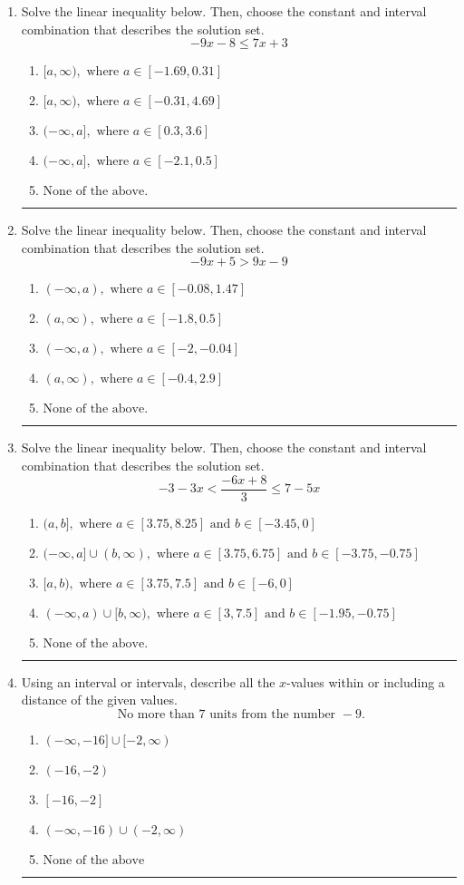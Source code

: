 \documentclass[14pt]{extbook}
\newcommand{\litem}[1]{\item#1\hspace*{-1cm}\rule{\textwidth}{0.4pt}}
\begin{document}
\begin{enumerate}
{\begin{enumerate}[label=\Alph*.]
\end{enumerate} }
\litem{
Solve the linear inequality below. Then, choose the constant and interval combination that describes the solution set.\[ -9x -8 \leq 7x + 3 \]\begin{enumerate}[label=\Alph*.]
\item \( [a, \infty), \text{ where } a \in [-1.69, 0.31] \)
\item \( [a, \infty), \text{ where } a \in [-0.31, 4.69] \)
\item \( (-\infty, a], \text{ where } a \in [0.3, 3.6] \)
\item \( (-\infty, a], \text{ where } a \in [-2.1, 0.5] \)
\item \( \text{None of the above}. \)

\end{enumerate} }
\litem{
Solve the linear inequality below. Then, choose the constant and interval combination that describes the solution set.\[ -9x + 5 > 9x -9 \]\begin{enumerate}[label=\Alph*.]
\item \( (-\infty, a), \text{ where } a \in [-0.08, 1.47] \)
\item \( (a, \infty), \text{ where } a \in [-1.8, 0.5] \)
\item \( (-\infty, a), \text{ where } a \in [-2, -0.04] \)
\item \( (a, \infty), \text{ where } a \in [-0.4, 2.9] \)
\item \( \text{None of the above}. \)

\end{enumerate} }
\litem{
Solve the linear inequality below. Then, choose the constant and interval combination that describes the solution set.\[ -3 - 3 x < \frac{-6 x + 8}{3} \leq 7 - 5 x \]\begin{enumerate}[label=\Alph*.]
\item \( (a, b], \text{ where } a \in [3.75, 8.25] \text{ and } b \in [-3.45, 0] \)
\item \( (-\infty, a] \cup (b, \infty), \text{ where } a \in [3.75, 6.75] \text{ and } b \in [-3.75, -0.75] \)
\item \( [a, b), \text{ where } a \in [3.75, 7.5] \text{ and } b \in [-6, 0] \)
\item \( (-\infty, a) \cup [b, \infty), \text{ where } a \in [3, 7.5] \text{ and } b \in [-1.95, -0.75] \)
\item \( \text{None of the above.} \)

\end{enumerate} }
\litem{
Using an interval or intervals, describe all the $x$-values within or including a distance of the given values.\[ \text{ No more than } 7 \text{ units from the number } -9. \]\begin{enumerate}[label=\Alph*.]
\item \( (-\infty, -16] \cup [-2, \infty) \)
\item \( (-16, -2) \)
\item \( [-16, -2] \)
\item \( (-\infty, -16) \cup (-2, \infty) \)
\item \( \text{None of the above} \)


\end{enumerate}}
\end{enumerate}
\end{document}
